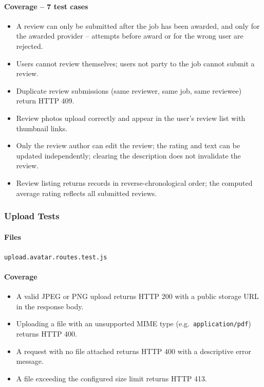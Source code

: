 \documentclass[11pt]{article}
\begin{document}
\paragraph{Coverage -- 7 test cases}
\begin{itemize}[leftmargin=1.4em]
  \item A review can only be submitted after the job has been awarded, and only for the awarded provider -- attempts before award or for the wrong user are rejected.
  \item Users cannot review themselves; users not party to the job cannot submit a review.
  \item Duplicate review submissions (same reviewer, same job, same reviewee) return HTTP 409.
  \item Review photos upload correctly and appear in the user's review list with thumbnail links.
  \item Only the review author can edit the review; the rating and text can be updated independently; clearing the description does not invalidate the review.
  \item Review listing returns records in reverse-chronological order; the computed average rating reflects all submitted reviews.
\end{itemize}

\subsubsection{Upload Tests}

\paragraph{Files}
\texttt{upload.avatar.routes.test.js}

\paragraph{Coverage}
\begin{itemize}[leftmargin=1.4em]
  \item A valid JPEG or PNG upload returns HTTP 200 with a public storage URL in the response body.
  \item Uploading a file with an unsupported MIME type (e.g.\ \texttt{application/pdf}) returns HTTP 400.
  \item A request with no file attached returns HTTP 400 with a descriptive error message.
  \item A file exceeding the configured size limit returns HTTP 413.
\end{itemize}
\end{document}
